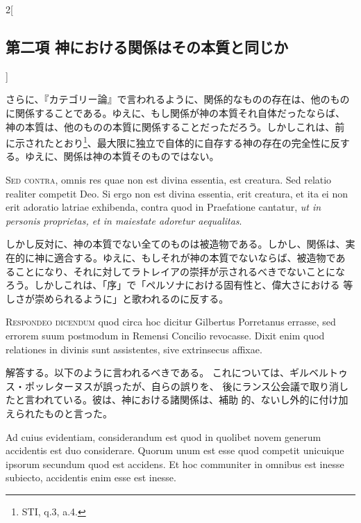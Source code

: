 \documentclass[paper=a4paper,fontsize=10pt,jafontsize=9pt,titlepage]{jlreq}
\begin{document}
\begin{paracol}{2}[\subsection{第二項 神における関係はその本質と同じか}]
\switchcolumn


さらに、『カテゴリー論』で言われるように、関係的なものの存在は、他のもの
 に関係することである。ゆえに、もし関係が神の本質それ自体だったならば、
 神の本質は、他のものの本質に関係することだっただろう。しかしこれは、前
 に示されたとおり\footnote{STI, q.3, a.4.}、最大限に独立で自体的に自存する神の存在の完全性に反す
 る。ゆえに、関係は神の本質そのものではない。


\switchcolumn*[\subsection{s.c.}]


{\scshape Sed contra}, omnis res quae non est divina essentia, est creatura. Sed
relatio realiter competit Deo. Si ergo non est divina essentia, erit
creatura, et ita ei non erit adoratio latriae exhibenda, contra quod in
Praefatione cantatur, {\itshape ut in personis proprietas, et in maiestate
adoretur aequalitas}.


\switchcolumn


しかし反対に、神の本質でない全てのものは被造物である。しかし、関係は、実
 在的に神に適合する。ゆえに、もしそれが神の本質でないならば、被造物であ
 ることになり、それに対してラトレイアの崇拝が示されるべきでないことにな
 ろう。しかしこれは、「序」で「ペルソナにおける固有性と、偉大さにおける
 等しさが崇められるように」と歌われるのに反する。




{\scshape Respondeo dicendum} quod circa hoc dicitur Gilbertus Porretanus errasse,
sed errorem suum postmodum in Remensi Concilio revocasse. Dixit enim
quod relationes in divinis sunt assistentes, sive extrinsecus
affixae.


\switchcolumn


解答する。以下のように言われるべきである。
これについては、ギルベルトゥス・ポッレターヌスが誤ったが、自らの誤りを、
後にランス公会議で取り消したと言われている。彼は、神における諸関係は、補助
 的、ないし外的に付け加えられたものと言った。


\switchcolumn*


Ad cuius evidentiam, considerandum est quod in quolibet novem
generum accidentis est duo considerare. Quorum unum est esse quod
competit unicuique ipsorum secundum quod est accidens. Et hoc communiter
in omnibus est inesse subiecto, accidentis enim esse est inesse.



\end{paracol}
\end{document}
